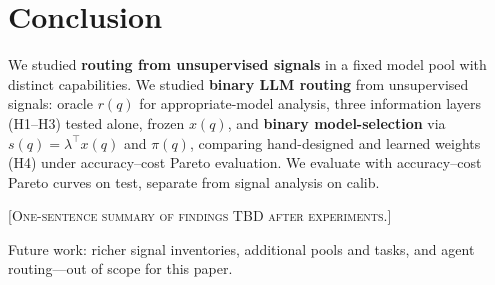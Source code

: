 \section{Conclusion}
\label{sec:conclusion}

We studied \textbf{routing from unsupervised signals} in a fixed model pool with distinct capabilities.
We studied \textbf{binary LLM routing} from unsupervised signals: oracle $r(q)$ for appropriate-model analysis, three information layers (H1--H3) tested alone, frozen $x(q)$, and \textbf{binary model-selection} via $s(q)=\lambda^\top x(q)$ and $\pi(q)$, comparing hand-designed and learned weights (H4) under accuracy--cost Pareto evaluation.
We evaluate with accuracy--cost Pareto curves on test, separate from signal analysis on calib.

\textsc{[One-sentence summary of findings TBD after experiments.]}

Future work: richer signal inventories, additional pools and tasks, and agent routing---out of scope for this paper.
